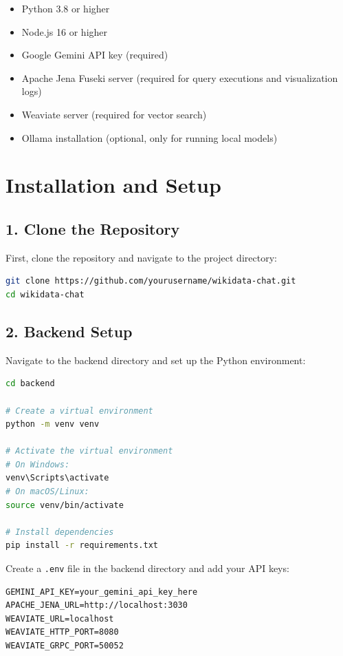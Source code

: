 \begin{itemize}
    \item Python 3.8 or higher
    \item Node.js 16 or higher
    \item Google Gemini API key (required)
    \item Apache Jena Fuseki server (required for query executions and visualization logs)
    \item Weaviate server (required for vector search)
    \item Ollama installation (optional, only for running local models)
\end{itemize}

\section*{Installation and Setup}

\subsection*{1. Clone the Repository}

First, clone the repository and navigate to the project directory:

\begin{lstlisting}[language=bash]
git clone https://github.com/yourusername/wikidata-chat.git
cd wikidata-chat
\end{lstlisting}

\subsection*{2. Backend Setup}

Navigate to the backend directory and set up the Python environment:

\begin{lstlisting}[language=bash]
cd backend

# Create a virtual environment
python -m venv venv

# Activate the virtual environment
# On Windows:
venv\Scripts\activate
# On macOS/Linux:
source venv/bin/activate

# Install dependencies
pip install -r requirements.txt
\end{lstlisting}

Create a \texttt{.env} file in the backend directory and add your API keys:

\begin{lstlisting}
GEMINI_API_KEY=your_gemini_api_key_here
APACHE_JENA_URL=http://localhost:3030
WEAVIATE_URL=localhost
WEAVIATE_HTTP_PORT=8080
WEAVIATE_GRPC_PORT=50052
\end{lstlisting}


